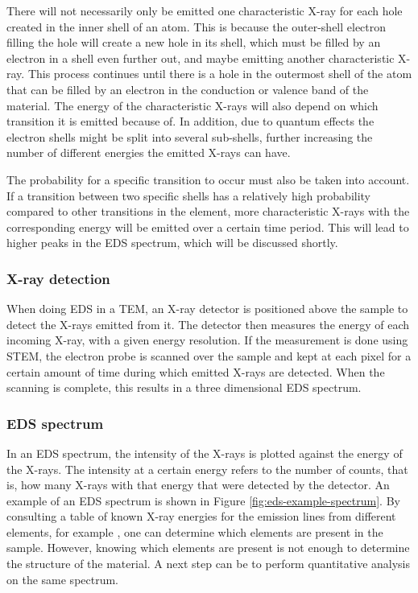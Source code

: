 There will not necessarily only be emitted one characteristic X-ray for each hole created in the inner shell of an atom. This is because the outer-shell electron filling the hole will create a new hole in its shell, which must be filled by an electron in a shell even further out, and maybe emitting another characteristic X-ray. This process continues until there is a hole in the outermost shell of the atom that can be filled by an electron in the conduction or valence band of the material. The energy of the characteristic X-rays will also depend on which transition it is emitted because of. In addition, due to quantum effects the electron shells might be split into several sub-shells, further increasing the number of different energies the emitted X-rays can have.

The probability for a specific transition to occur must also be taken into account. If a transition between two specific shells has a relatively high probability compared to other transitions in the element, more characteristic X-rays with the corresponding energy will be emitted over a certain time period. This will lead to higher peaks in the EDS spectrum, which will be discussed shortly.

		\subsubsection{X-ray detection}
When doing EDS in a TEM, an X-ray detector is positioned above the sample to detect the X-rays emitted from it. The detector then measures the energy of each incoming X-ray, with a given energy resolution. If the measurement is done using STEM, the electron probe is scanned over the sample and kept at each pixel for a certain amount of time during which emitted X-rays are detected. When the scanning is complete, this results in a three dimensional EDS spectrum.

		\subsubsection{EDS spectrum}\label{sec:eds-spec}
In an EDS spectrum, the intensity of the X-rays is plotted against the energy of the X-rays. The intensity at a certain energy refers to the number of counts, that is, how many X-rays with that energy that were detected by the detector. An example of an EDS spectrum is shown in Figure \ref{fig:eds-example-spectrum}. By consulting a table of known X-ray energies for the emission lines from different elements, for example \cite{x-ray-booklet}, one can determine which elements are present in the sample. However, knowing which elements are present is not enough to determine the structure of the material. A next step can be to perform quantitative analysis on the same spectrum.

